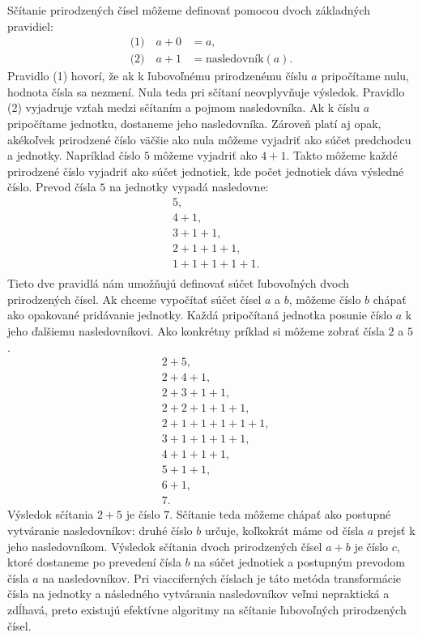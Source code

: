 \documentclass{article}
\begin{document}
Sčítanie prirodzených čísel môžeme definovať pomocou dvoch základných pravidiel:
\[
\begin{aligned}
  \text{(1)}\quad a + 0 &= a, \\
  \text{(2)}\quad a + 1 &= \text{nasledovník}(a).
\end{aligned}
\]
Pravidlo (1) hovorí, že ak k ľubovoľnému prirodzenému číslu \(a\) pripočítame nulu, hodnota čísla sa nezmení. Nula teda pri sčítaní neovplyvňuje výsledok. Pravidlo (2) vyjadruje vzťah medzi sčítaním a pojmom nasledovníka. Ak k číslu \(a\) pripočítame jednotku, dostaneme jeho nasledovníka. Zároveň platí aj opak, akékoľvek prirodzené číslo väčšie ako nula môžeme vyjadriť ako súčet predchodcu a jednotky. Napríklad číslo \(5\) môžeme vyjadriť ako \(4 + 1\). Takto môžeme každé prirodzené číslo vyjadriť ako súčet jednotiek, kde počet jednotiek dáva výsledné číslo. Prevod čísla \(5\) na jednotky vypadá nasledovne:
\[
\begin{aligned}
  &5, \\
  &4 + 1, \\
  &3 + 1 + 1, \\
  &2 + 1 + 1 + 1, \\
  &1 + 1 + 1 + 1 + 1. \\
\end{aligned}
\]
Tieto dve pravidlá nám umožňujú definovať súčet ľubovoľných dvoch prirodzených čísel. Ak chceme vypočítať súčet čísel \(a\) a \(b\), môžeme číslo \(b\) chápať ako opakované pridávanie jednotky. Každá pripočítaná jednotka posunie číslo \(a\) k jeho ďalšiemu nasledovníkovi. Ako konkrétny príklad si môžeme zobrať čísla \(2\) a \(5\).
\[
\begin{aligned}
  &2 + 5, \\
  &2 + 4 + 1, \\
  &2 + 3 + 1 + 1, \\
  &2 + 2 + 1 + 1 + 1, \\
  &2 + 1 + 1 + 1 + 1 + 1, \\
  &3 + 1 + 1 + 1 + 1, \\
  &4 + 1 + 1 + 1, \\
  &5 + 1 + 1, \\
  &6 + 1, \\
  &7.
\end{aligned}
\]
Výsledok sčítania \(2 + 5\) je číslo \(7\). Sčítanie teda môžeme chápať ako postupné vytváranie nasledovníkov: druhé číslo \(b\) určuje, koľkokrát máme od čísla \(a\) prejsť k jeho nasledovníkom. Výsledok sčítania dvoch prirodzených čísel \(a + b\) je číslo \(c\), ktoré dostaneme po prevedení čísla \(b\) na súčet jednotiek a postupným prevodom čísla \(a\) na nasledovníkov. Pri viacciferných číslach je táto metóda transformácie čísla na jednotky a následného vytvárania nasledovníkov veľmi nepraktická a zdĺhavá, preto existujú efektívne algoritmy na sčítanie ľubovoľných prirodzených čísel.
\end{document}
